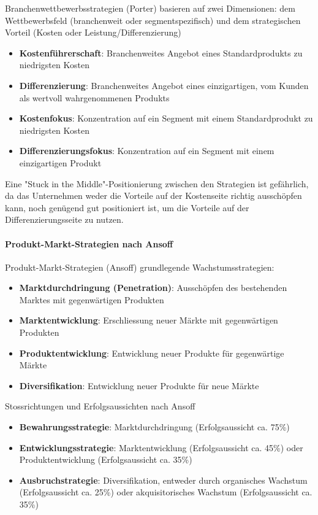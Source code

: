 \begin{definition}{Branchenwettbewerbsstrategien (Porter)}
    basieren auf zwei Dimensionen: dem Wettbewerbsfeld (branchenweit oder segmentspezifisch) und dem strategischen Vorteil (Kosten oder Leistung/Differenzierung)
\begin{itemize}
    \item \textbf{Kostenführerschaft}: Branchenweites Angebot eines Standardprodukts zu niedrigsten Kosten
    \item \textbf{Differenzierung}: Branchenweites Angebot eines einzigartigen, vom Kunden als wertvoll wahrgenommenen Produkts
    \item \textbf{Kostenfokus}: Konzentration auf ein Segment mit einem Standardprodukt zu niedrigsten Kosten
    \item \textbf{Differenzierungsfokus}: Konzentration auf ein Segment mit einem einzigartigen Produkt
\end{itemize}
\small
{} Eine "Stuck in the Middle"-Positionierung zwischen den Strategien ist gefährlich, da das Unternehmen weder die Vorteile auf der Kostenseite richtig ausschöpfen kann, noch genügend gut positioniert ist, um die Vorteile auf der Differenzierungsseite zu nutzen.
\end{definition}

\paragraph{Produkt-Markt-Strategien nach Ansoff}

\begin{definition}{Produkt-Markt-Strategien (Ansoff)} grundlegende Wachstumsstrategien:
\begin{itemize}
    \item \textbf{Marktdurchdringung (Penetration)}: Ausschöpfen des bestehenden Marktes mit gegenwärtigen Produkten
    \item \textbf{Marktentwicklung}: Erschliessung neuer Märkte mit gegenwärtigen Produkten
    \item \textbf{Produktentwicklung}: Entwicklung neuer Produkte für gegenwärtige Märkte
    \item \textbf{Diversifikation}: Entwicklung neuer Produkte für neue Märkte
\end{itemize}
\end{definition}

\begin{concept}{Stossrichtungen und Erfolgsaussichten nach Ansoff}
\begin{itemize}
    \item \textbf{Bewahrungsstrategie}: Marktdurchdringung (Erfolgsaussicht ca. 75\%)
    \item \textbf{Entwicklungsstrategie}: Marktentwicklung (Erfolgsaussicht ca. 45\%) oder Produktentwicklung (Erfolgsaussicht ca. 35\%)
    \item \textbf{Ausbruchstrategie}: Diversifikation, entweder durch organisches Wachstum (Erfolgsaussicht ca. 25\%) oder akquisitorisches Wachstum (Erfolgsaussicht ca. 35\%)
\end{itemize}
\end{concept}



